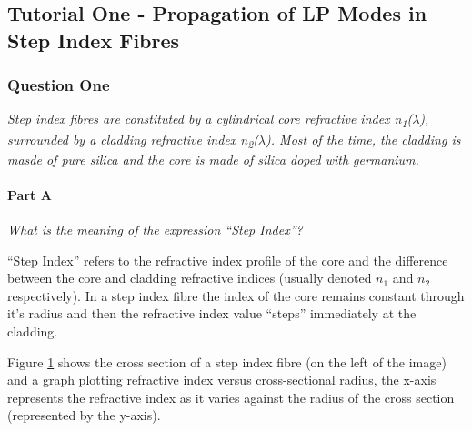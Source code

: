 \documentclass[colorlinks,11pt,a4paper,normalphoto,withhyper,ragged2e]{altareport}
\begin{document}
\subsection{Tutorial One - Propagation of LP Modes in Step Index Fibres}
\subsubsection{Question One}
\textit{Step index fibres are constituted by a cylindrical core refractive index n\textsubscript{1}($\lambda$), surrounded by a cladding refractive index n\textsubscript{2}($\lambda$). Most of the time, the cladding is masde of pure silica and the core is made of silica doped with germanium.} \\


\paragraph{Part A \linebreak}
\textit{What is the meaning of the expression ``Step Index''?} \linebreak



\begin{paracol}{2}

``Step Index'' refers to the refractive index profile of the core and the difference between the core and cladding refractive indices (usually denoted $n_1$ and $n_2$ respectively). In a step index fibre the index of the core remains constant through it's radius and then the refractive index value ``steps'' immediately at the cladding.

Figure \ref{fig:fibre_index_profile} shows the cross section of a step index fibre (on the left of the image) and a graph plotting refractive index versus cross-sectional radius, the x-axis represents the refractive index as it varies against the radius of the cross section (represented by the y-axis).


\switchcolumn

\begin{figure}[h]
	\centering
	\scalebox{0.4}{}
	
    \caption{}

    \label{fig:fibre_index_profile}
\end{figure}

\end{paracol}
\end{document}
